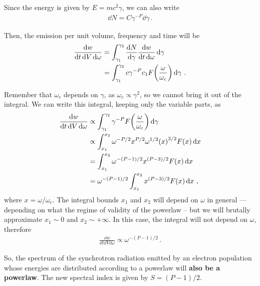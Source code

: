 \documentclass[main.tex]{subfiles}
\begin{document}
Since the energy is given by \(E = mc^2 \gamma \), we can also write 
%
\begin{align}
\dd{N} = C \gamma^{-P} \dd{\gamma }
\,.
\end{align}

Then, the emission per unit volume, frequency and time will be 
%
\begin{align}
\frac{ \dd{w}}{ \dd{t} \dd{V} \dd{\omega }} 
&= \int_{\gamma_1 }^{\gamma_2 } \frac{ \dd{N}}{ \dd{\gamma }} \frac{ \dd{w}}{ \dd{t} \dd{\omega }}  \dd{\gamma }  \\
&= \int_{\gamma_1 }^{\gamma_2 } c \gamma^{-P } c_1 F \qty(\frac{\omega }{\omega _c}) \dd{\gamma }
\,.
\end{align}

Remember that \(\omega_c\) depends on \(\gamma \), as \(\omega _c \propto \gamma^{2}\), so we cannot bring it out of the integral. 
We can write this integral, keeping only the variable parts, as 
%
\begin{align}
\frac{ \dd{w}}{ \dd{t} \dd{V} \dd{\omega }} 
&\propto \int_{\gamma_1 }^{\gamma_2 } \gamma^{-P} F \qty(\frac{\omega }{\omega _c}) \dd{\gamma }  \\
&\propto \int_{x_1 }^{x_2 } \omega^{-P / 2} x^{P/2} \omega^{1/2} \qty(x)^{3/2} F \qty(x) \dd{ x}  \\
&= \int_{x_1 }^{x_2 } \omega^{-(P-1)/2} x^{(P-3) / 2} F \qty(x) \dd{x}   \\
&= \omega^{- (P-1 ) / 2} \int_{x_1 }^{x_2 } x^{(P-3) / 2} F(x) \dd{x}
\,,
\end{align}
%
where \(x = \omega / \omega _c\). 
The integral bounds \(x_1 \) and \(x_2 \) will depend on \(\omega \) in general --- depending on what the regime of validity of the powerlaw --  but we will brutally approximate \(x_1 \sim 0 \) and \(x_2 \sim + \infty \).
In this case, the integral will not depend on \(\omega \), therefore 
%
\begin{align}
\frac{ \dd{w}}{ \dd{t} \dd{V} \dd{\omega }} 
\propto \omega^{- (P-1) / 2}
\,.
\end{align}

So, the spectrum of the synchrotron radiation emitted by an electron population whose energies are distributed according to a powerlaw will \textbf{also be a powerlaw}.
The new spectral index is given by \(S = (P-1) / 2\). 
\end{document}
